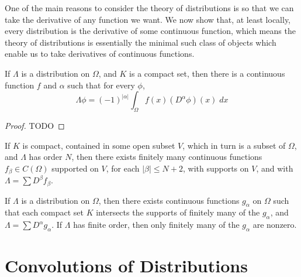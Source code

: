 One of the main reasons to consider the theory of distributions is so that we can take the derivative of any function we want. We now show that, at least locally, every distribution is the derivative of some continuous function, which means the theory of distributions is essentially the minimal such class of objects which enable us to take derivatives of continuous functions.

\begin{theorem}
    If $\Lambda$ is a distribution on $\Omega$, and $K$ is a compact set, then there is a continuous function $f$ and $\alpha$ such that for every $\phi$,
    \[ \Lambda \phi = (-1)^{|\alpha|} \int_\Omega f(x) (D^\alpha \phi)(x)\; dx \]
\end{theorem}
\begin{proof}
    TODO
\end{proof}

\begin{theorem}
    If $K$ is compact, contained in some open subset $V$, which in turn is a subset of $\Omega$, and $\Lambda$ has order $N$, then there exists finitely many continuous functions $f_\beta \in C(\Omega)$ supported on $V$, for each $|\beta| \leq N + 2$, with supports on $V$, and with $\Lambda = \sum D^\beta f_\beta$.
\end{theorem}

\begin{theorem}
    If $\Lambda$ is a distribution on $\Omega$, then there exists continuous functions $g_\alpha$ on $\Omega$ such that each compact set $K$ intersects the supports of finitely many of the $g_\alpha$, and $\Lambda = \sum D^\alpha g_\alpha$. If $\Lambda$ has finite order, then only finitely many of the $g_\alpha$ are nonzero.
\end{theorem}

\section{Convolutions of Distributions}

